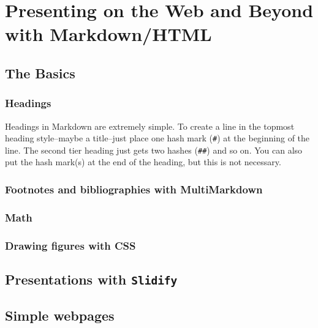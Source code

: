 



\chapter{Presenting on the Web and Beyond with Markdown/HTML}\label{MarkdownChapter}


\section{The Basics}

\subsection{Headings}

Headings in Markdown are extremely simple. To create a line in the topmost heading style--maybe a title--just place one hash mark (\texttt{\#}) at the beginning of the line. The second tier heading just gets two hashes (\texttt{\#\#}) and so on. You can also put the hash mark(s) at the end of the heading, but this is not necessary.

\subsection{Footnotes and bibliographies with MultiMarkdown}

\subsection{Math}

\subsection{Drawing figures with CSS}

\section{Presentations with \texttt{Slidify}}

\section{Simple webpages}

